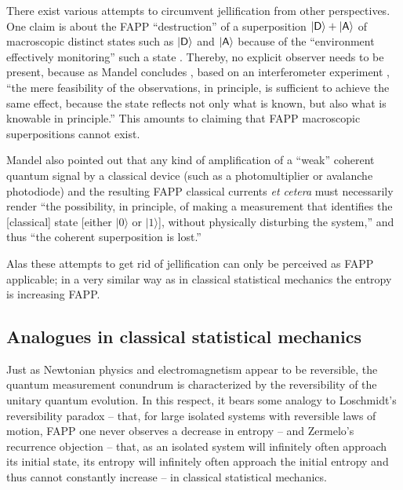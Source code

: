 \documentclass[%
  preprint,
 showpacs,
 showkeys,
 preprintnumbers,
 amsmath,amssymb,
 aps,
   pra,
  longbibliography,
 ]{revtex4-1}
\begin{document}
There exist various attempts to circumvent jellification from other perspectives.
One claim is about the FAPP ``destruction'' of a superposition  $\vert {\textsf D} \rangle + \vert {\textsf A} \rangle$ of macroscopic distinct states
such as $\vert {\textsf D} \rangle $ and $ \vert {\textsf A} \rangle$    because of the
``environment effectively monitoring'' such a state \cite{RevModPhys.75.715}.
Thereby, no explicit observer needs to be present, because as
Mandel concludes \cite{mandel-operational-cat},
based on an interferometer experiment \cite{zou-wang-mandel:91a,zou-wang-mandel:91b},
``the
mere feasibility of the observations, in principle, is sufficient to achieve the same effect, because
the state reflects not only what is known, but also what is knowable in principle.''
This amounts to claiming that FAPP macroscopic superpositions cannot exist.

Mandel also pointed out that any kind of amplification of a ``weak'' coherent quantum signal by a classical device
(such as a photomultiplier or avalanche photodiode) and the resulting FAPP classical currents {\it et cetera}
must necessarily render
``the possibility, in principle, of making a measurement that identifies the [classical] state
[either $\vert 0 \rangle$ or $\vert 1 \rangle$], without physically disturbing
the system,'' and thus ``the coherent superposition is lost.''

Alas these attempts to get rid of jellification can only be perceived as FAPP applicable;
in a very similar way as in classical statistical mechanics the entropy is increasing FAPP.


\subsection{Analogues in classical statistical mechanics}

Just as Newtonian physics and electromagnetism appear to be reversible,
the quantum measurement conundrum is characterized by the reversibility of
the unitary quantum evolution.
In this respect, it
bears some analogy to Loschmidt's reversibility paradox \cite[p.~139]{Loschmidt}
--
that, for large isolated systems with reversible laws of motion, FAPP  one never
observes a decrease in entropy
--
and Zermelo's recurrence objection  \cite[pp.~18ff]{Ebbinghaus-Zermelo}
--
that, as an isolated system will infinitely often approach its initial
state, its entropy will infinitely often approach the initial entropy and thus cannot constantly
increase
--
in classical statistical mechanics.
\end{document}
